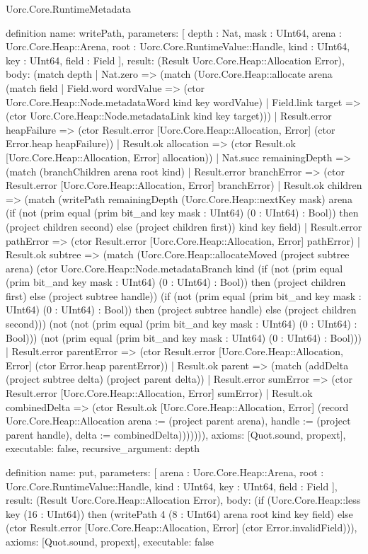 \begin{lexlean}{Uorc.Core.RuntimeMetadata}
\begin{semanticmodule}
definition{
  name: writePath,
  parameters: [
    depth : Nat,
    mask : UInt64,
    arena : Uorc.Core.Heap::Arena,
    root : Uorc.Core.RuntimeValue::Handle,
    kind : UInt64,
    key : UInt64,
    field : Field
  ],
  result: (Result Uorc.Core.Heap::Allocation Error),
  body: (match depth
    | Nat.zero => (match (Uorc.Core.Heap::allocate arena (match field
        | Field.word wordValue => (ctor Uorc.Core.Heap::Node.metadataWord kind key wordValue)
        | Field.link target => (ctor Uorc.Core.Heap::Node.metadataLink kind key target)))
      | Result.error heapFailure => (ctor Result.error [Uorc.Core.Heap::Allocation, Error] (ctor Error.heap heapFailure))
      | Result.ok allocation => (ctor Result.ok [Uorc.Core.Heap::Allocation, Error] allocation))
    | Nat.succ remainingDepth => (match (branchChildren arena root kind)
      | Result.error branchError => (ctor Result.error [Uorc.Core.Heap::Allocation, Error] branchError)
      | Result.ok children => (match (writePath remainingDepth (Uorc.Core.Heap::nextKey mask) arena (if (not (prim equal (prim bit_and key mask : UInt64) (0 : UInt64) : Bool)) then (project children second) else (project children first)) kind key field)
        | Result.error pathError => (ctor Result.error [Uorc.Core.Heap::Allocation, Error] pathError)
        | Result.ok subtree => (match (Uorc.Core.Heap::allocateMoved (project subtree arena) (ctor Uorc.Core.Heap::Node.metadataBranch kind (if (not (prim equal (prim bit_and key mask : UInt64) (0 : UInt64) : Bool)) then (project children first) else (project subtree handle)) (if (not (prim equal (prim bit_and key mask : UInt64) (0 : UInt64) : Bool)) then (project subtree handle) else (project children second))) (not (not (prim equal (prim bit_and key mask : UInt64) (0 : UInt64) : Bool))) (not (prim equal (prim bit_and key mask : UInt64) (0 : UInt64) : Bool)))
          | Result.error parentError => (ctor Result.error [Uorc.Core.Heap::Allocation, Error] (ctor Error.heap parentError))
          | Result.ok parent => (match (addDelta (project subtree delta) (project parent delta))
            | Result.error sumError => (ctor Result.error [Uorc.Core.Heap::Allocation, Error] sumError)
            | Result.ok combinedDelta => (ctor Result.ok [Uorc.Core.Heap::Allocation, Error] (record Uorc.Core.Heap::Allocation {arena := (project parent arena), handle := (project parent handle), delta := combinedDelta}))))))),
  axioms: [Quot.sound, propext],
  executable: false,
  recursive_argument: depth
}

definition{
  name: put,
  parameters: [
    arena : Uorc.Core.Heap::Arena,
    root : Uorc.Core.RuntimeValue::Handle,
    kind : UInt64,
    key : UInt64,
    field : Field
  ],
  result: (Result Uorc.Core.Heap::Allocation Error),
  body: (if (Uorc.Core.Heap::less key (16 : UInt64)) then (writePath 4 (8 : UInt64) arena root kind key field) else (ctor Result.error [Uorc.Core.Heap::Allocation, Error] (ctor Error.invalidField))),
  axioms: [Quot.sound, propext],
  executable: false
}


\end{semanticmodule}
\end{lexlean}
